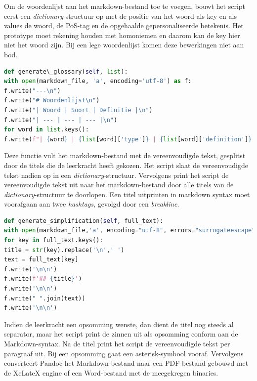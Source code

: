 Om de woordenlijst aan het markdown-bestand toe te voegen, bouwt het script eerst een \textit{dictionary}-structuur op met de positie van het woord als key en als values de woord, de PoS-tag en de opgehaalde gepersonaliseerde betekenis. Het prototype moet rekening houden met homoniemen en daarom kan de key hier niet het woord zijn. Bij een lege woordenlijst komen deze bewerkingen niet aan bod. 

\begin{lstlisting}[language=Python, caption={Een woordenlijst genereren met de Writer-klasse.}, label={code:writer-glossary-klasse}]
def generate\_glossary(self, list):
with open(markdown_file, 'a', encoding='utf-8') as f:
f.write("---\n")
f.write("# Woordenlijst\n")
f.write("| Woord | Soort | Definitie |\n")
f.write("| --- | --- | --- |\n")
for word in list.keys(): 
f.write(f"| {word} | {list[word]['type']} | {list[word]['definition']} |\n")
\end{lstlisting}

Deze functie vult het markdown-bestand met de vereenvoudigde tekst, gesplitst door de titels die de leerkracht heeft gekozen. Het script slaat de vereenvoudigde tekst nadien op in een \textit{dictionary}-structuur. Vervolgens print het script de vereenvoudigde tekst uit naar het markdown-bestand door alle titels van de \textit{dictionary}-structuur te doorlopen. Een titel uitprinten in markdown syntax moet voorafgaan aan twee \textit{hashtags}, gevolgd door een \textit{breakline}. 

\begin{lstlisting}[language=Python, caption={Een doorlopende tekst toevoegen aan het markdownbestand met de Writer-klasse.}, label={code:writer-doorlopende-klasse}]
def generate_simplification(self, full_text):
with open(markdown_file,'a', encoding="utf-8", errors="surrogateescape") as f:
for key in full_text.keys():
title = str(key).replace('\n',' ')
text = full_text[key]
f.write('\n\n')
f.write(f'## {title}')
f.write('\n\n')
f.write(" ".join(text))
f.write('\n\n')
\end{lstlisting}

Indien de leerkracht een opsomming wenste, dan dient de titel nog steeds al separator, maar het script print de zinnen uit als opsomming conform aan de Markdown-syntax. Na de titel print het script de vereenvoudigde tekst per paragraaf uit. Bij een opsomming gaat een asterisk-symbool vooraf. Vervolgens converteert Pandoc het Markdown-bestand naar een PDF-bestand gebouwd met de XeLateX engine of een Word-bestand met de meegekregen binaries. 

